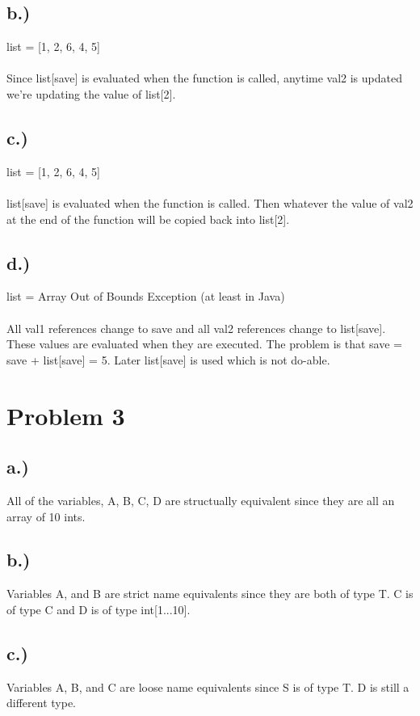 \documentclass{article}
\begin{document}
\subsection*{b.)}
list = [1, 2, 6, 4, 5] \\ \\
Since list[save] is evaluated when the function is called, anytime val2 is updated we're
updating the value of list[2].

\subsection*{c.)}
list = [1, 2, 6, 4, 5] \\ \\
list[save] is evaluated when the function is called. Then whatever the value of val2 at
the end of the function will be copied back into list[2].

\subsection*{d.)}
list = Array Out of Bounds Exception (at least in Java) \\ \\
All val1 references change to save and all val2 references change to list[save]. These values
are evaluated when they are executed. The problem is that save = save + list[save] = 5. Later
list[save] is used which is not do-able.

\newpage

\section*{Problem 3}
\subsection*{a.)}
All of the variables, A, B, C, D are structually equivalent since they are all an array of 10 ints.

\subsection*{b.)}
Variables A, and B are strict name equivalents since they are both of type T. C is of type C and D is 
of type int[1...10].

\subsection*{c.)}
Variables A, B, and C are loose name equivalents since S is of type T. D is still a different type.
\end{document}
